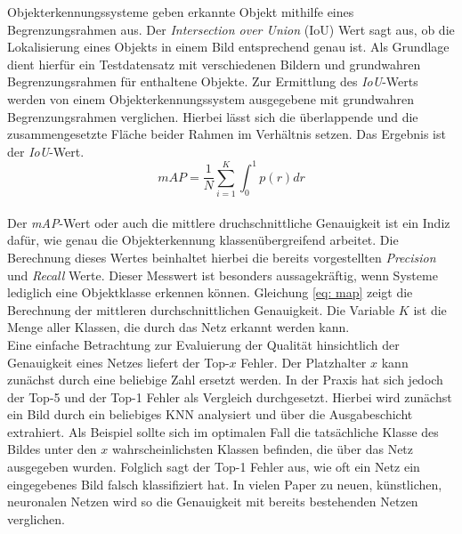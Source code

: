 		Objekterkennungssysteme geben erkannte Objekt mithilfe eines Begrenzungsrahmen aus.  Der \textit{Intersection over Union} (IoU) Wert sagt aus, ob die Lokalisierung eines Objekts in einem Bild entsprechend genau ist. Als Grundlage dient hierfür ein Testdatensatz mit verschiedenen Bildern und grundwahren Begrenzungsrahmen für enthaltene Objekte. Zur Ermittlung des \textit{IoU}-Werts werden von einem Objekterkennungssystem ausgegebene mit grundwahren Begrenzungsrahmen verglichen. Hierbei lässt sich die überlappende und die zusammengesetzte Fläche beider Rahmen im Verhältnis setzen. Das Ergebnis ist der \textit{IoU}-Wert.    \\
		
		\begin{equation}
		mAP = \frac{1}{N}\sum_{i=1}^{K}\int_{0}^{1}p(r)dr
		\label{eq: map}
		\end{equation}\\
		
		Der \textit{mAP}-Wert oder auch die mittlere druchschnittliche Genauigkeit ist ein Indiz dafür, wie genau die Objekterkennung klassenübergreifend arbeitet. Die Berechnung dieses Wertes beinhaltet hierbei die bereits vorgestellten \textit{Precision} und \textit{Recall} Werte. Dieser Messwert ist besonders aussagekräftig, wenn Systeme lediglich eine Objektklasse erkennen können. Gleichung \ref{eq: map} zeigt die Berechnung der mittleren durchschnittlichen Genauigkeit. Die Variable $K$ ist die Menge aller Klassen, die durch das Netz erkannt werden kann.  \\
		
		Eine einfache Betrachtung zur Evaluierung der Qualität hinsichtlich der Genauigkeit eines Netzes liefert der Top-$x$ Fehler. Der Platzhalter $x$ kann zunächst durch eine beliebige Zahl ersetzt werden. In der Praxis hat sich jedoch der Top-5 und der Top-1 Fehler als Vergleich durchgesetzt. Hierbei wird zunächst ein Bild durch ein beliebiges KNN analysiert und über die Ausgabeschicht extrahiert. Als Beispiel sollte sich im optimalen Fall die tatsächliche Klasse des Bildes unter den $x$ wahrscheinlichsten Klassen befinden, die über das Netz ausgegeben wurden. Folglich sagt der Top-1 Fehler aus, wie oft ein Netz ein eingegebenes Bild falsch klassifiziert hat. In vielen Paper zu neuen, künstlichen, neuronalen Netzen wird so die Genauigkeit mit bereits bestehenden Netzen verglichen.
		
		
		
		
		
		
